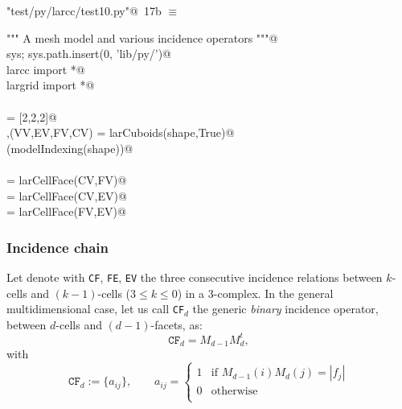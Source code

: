 \documentclass[11pt,oneside]{article}	%
\begin{document}
\begin{flushleft} \small \label{scrap30}
\protect{}\verb@"test/py/larcc/test10.py"@\nobreak\ {\footnotesize 17b }$\equiv$
\vspace{-1ex}
\begin{list}{}{} \item
\mbox{}\verb@""" A mesh model and various incidence operators """@\\
\mbox{}\verb@import sys; sys.path.insert(0, 'lib/py/')@\\
\mbox{}\verb@from larcc import *@\\
\mbox{}\verb@from largrid import *@\\
\mbox{}\verb@@\\
\mbox{}\verb@shape = [2,2,2]@\\
\mbox{}\verb@V,(VV,EV,FV,CV) = larCuboids(shape,True)@\\
\mbox{}\verb@VIEW(modelIndexing(shape))@\\
\mbox{}\verb@@\\
\mbox{}\verb@CF = larCellFace(CV,FV)@\\
\mbox{}\verb@CE = larCellFace(CV,EV)@\\
\mbox{}\verb@FE = larCellFace(FV,EV)@\\
\mbox{}\verb@@{\NWsep}
\end{list}
\vspace{-2ex}
\end{flushleft}

\subsubsection{Incidence chain}

Let denote with \texttt{CF}, \texttt{FE}, \texttt{EV} the three consecutive incidence relations between $k$-cells and $(k-1)$-cells ($3\leq k\leq 0$) in a 3-complex. In the general multidimensional case, let us call \texttt{CF}$_d$  the generic \emph{binary} incidence operator, between $d$-cells and $(d-1)$-facets, as:
\[
\texttt{CF}_d = M_{d-1} M_d^t, 
\]
with
\[
\texttt{CF}_d := \{a_{ij}\}, \qquad a_{ij} = 
\left\{
\begin{array}{cl}
1 & \mbox{if\ } M_{d-1}(i) M_d(j) = |f_j|  \\
0 & \mbox{otherwise}  \\  
\end{array}
\right.
\]
\end{document}
